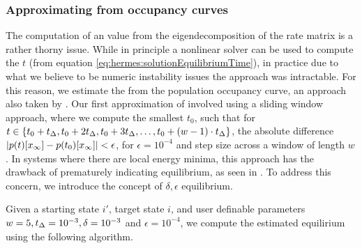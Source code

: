 \documentclass[11pt, oneside]{Thesis} %
\begin{document}
\subsubsection{Approximating \eqt from occupancy curves}
\label{subsubsec:hermes:eqestimate}

The computation of an \eqt value from the eigendecomposition of the rate matrix
is a rather thorny issue. While in principle a nonlinear solver can be used to
compute the \eqt $t$ (from equation \ref{eq:hermes:solutionEquilibriumTime}),
in practice due to what we believe to be numeric instability issues the approach
was intractable. For this reason, we estimate the \eqt from the population
occupancy curve, an approach also taken by \treekin
\citep{wolfingerstadler:kinetics}. Our first
approximation of \eqt involved using a sliding window approach, where we
compute the smallest $t_0$,
such that for $t \in \{t_0+t_{\Delta},t_0+2t_{\Delta},t_0+3t_{\Delta},\dots,t_0+(w-1)\cdot t_{\Delta}\}$, the absolute difference
$|p(t)[x_\infty] - p(t_0)[x_\infty]| < \epsilon$, for $\epsilon =
10^{-4}$ and step size \tD across a window of length $w$. In systems where there are local energy minima, this approach has the
drawback of prematurely indicating equilibrium, as seen in
. To address this concern, we introduce the
concept of $\delta,\epsilon$ equilibrium.

Given a starting state $i'$, target state $i$, and user definable parameters
$w = 5, t_{\Delta} = 10^{-3}, \delta = 10^{-3}$ and $\epsilon = 10^{-4}$, we compute the estimated
equilirium using the following algorithm.
\medskip
\end{document}
